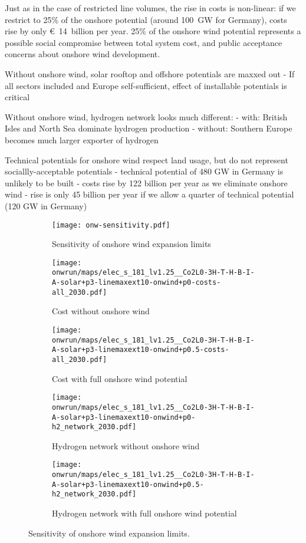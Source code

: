 Just as in the case of restricted line volumes, the rise in costs is non-linear:
if we restrict to 25\% of the onshore potential (around 100~GW for Germany),
costs rise by only \euro~14~billion per year. 25\% of the onshore wind potential
represents a possible social compromise between total system cost, and public
acceptance concerns about onshore wind development.

Without onshore wind, solar rooftop and offshore potentials are maxxed out
- If all sectors included and Europe self-sufficient, effect of installable potentials is critical

Without onshore wind, hydrogen network looks much different:
- with: British Isles and North Sea dominate hydrogen production
- without: Southern Europe becomes much larger exporter of hydrogen

Technical potentials for onshore wind respect land usage, but do not represent
sociallly-acceptable potentials
- technical potential of 480 GW in Germany is unlikely to be built
- costs rise by 122 billion per year as we eliminate onshore wind
- rise is only 45 billion per year if we allow a quarter of technical potential (120 GW in Germany)


\begin{figure}
    \centering
    \begin{subfigure}[t]{\textwidth}
        \centering
        \caption{Sensitivity of onshore wind expansion limits}
        \texttt{[image: onw-sensitivity.pdf]}
    \end{subfigure}
    \begin{subfigure}[t]{0.49\textwidth}
        \centering
        \caption{Cost without onshore wind}
        \texttt{[image: \\onwrun/maps/elec\_s\_181\_lv1.25\_\_Co2L0-3H-T-H-B-I-A-solar+p3-linemaxext10-onwind+p0-costs-all\_2030.pdf]}
    \end{subfigure}
    \begin{subfigure}[t]{0.49\textwidth}
        \centering
        \caption{Cost with full onshore wind potential}
        \texttt{[image: \\onwrun/maps/elec\_s\_181\_lv1.25\_\_Co2L0-3H-T-H-B-I-A-solar+p3-linemaxext10-onwind+p0.5-costs-all\_2030.pdf]}
    \end{subfigure}
    \begin{subfigure}[t]{0.49\textwidth}
        \centering
        \caption{Hydrogen network without onshore wind}
        \texttt{[image: \\onwrun/maps/elec\_s\_181\_lv1.25\_\_Co2L0-3H-T-H-B-I-A-solar+p3-linemaxext10-onwind+p0-h2\_network\_2030.pdf]}
    \end{subfigure}
    \begin{subfigure}[t]{0.49\textwidth}
        \centering
        \caption{Hydrogen network with full onshore wind potential}
        \texttt{[image: \\onwrun/maps/elec\_s\_181\_lv1.25\_\_Co2L0-3H-T-H-B-I-A-solar+p3-linemaxext10-onwind+p0.5-h2\_network\_2030.pdf]}
    \end{subfigure}
    \caption{Sensitivity of onshore wind expansion limits.}
    \label{fig:onw-restriction}
\end{figure}
\restoregeometry

